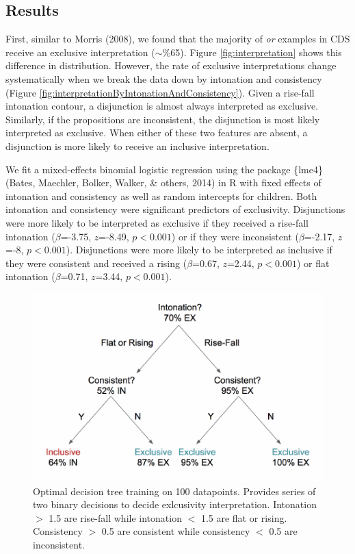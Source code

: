 \documentclass[10pt, letterpaper]{article}
\newenvironment{CodeChunk}{}{}
\begin{document}
\subsection{Results}\label{results-1}

First, similar to Morris (2008), we found that the majority of \emph{or}
examples in CDS receive an exclusive interpretation (\(\sim\)\%65).
Figure \ref{fig:interpretation} shows this difference in distribution.
However, the rate of exclusive interpretations change systematically
when we break the data down by intonation and consistency (Figure
\ref{fig:interpretationByIntonationAndConsistency}). Given a rise-fall
intonation contour, a disjunction is almost always interpreted as
exclusive. Similarly, if the propositions are inconsistent, the
disjunction is most likely interpreted as exclusive. When either of
these two features are absent, a disjunction is more likely to receive
an inclusive interpretation.

We fit a mixed-effects binomial logistic regression using the package
\{lme4\} (Bates, Maechler, Bolker, Walker, \& others, 2014) in R with
fixed effects of intonation and consistency as well as random intercepts
for children. Both intonation and consistency were significant
predictors of exclusivity. Disjunctions were more likely to be
interpreted as exclusive if they received a rise-fall intonation
(\(\beta\)=-3.75, \(z\)=-8.49, \(p < 0.001\)) or if they were
inconsistent (\(\beta\)=-2.17, \(z\)=-8, \(p < 0.001\)). Disjunctions
were more likely to be interpreted as inclusive if they were consistent
and received a rising (\(\beta\)=0.67, \(z\)=2.44, \(p < 0.001\)) or
flat intonation (\(\beta\)=0.71, \(z\)=3.44, \(p < 0.001\)).

\begin{CodeChunk}
\begin{figure}[tb]

{\centering \includegraphics{figs/treeDiagram-1} 

}

\caption[Optimal decision tree training on 100 datapoints]{Optimal decision tree training on 100 datapoints. Provides series of two binary decisions to decide exlcusivity interpretation. Intonation $>$ 1.5 are rise-fall while intonation $<$ 1.5 are flat or rising. Consistency $>$ 0.5 are consistent while consistency $<$ 0.5 are  inconsistent.}\label{fig:treeDiagram}
\end{figure}
\end{CodeChunk}
\end{document}
